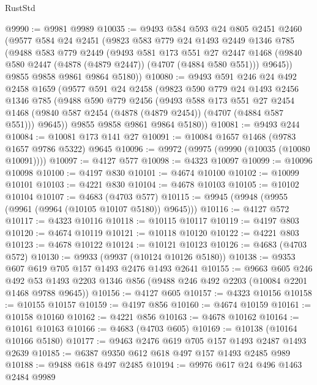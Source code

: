 \begin{lexlean}{RustStd}
\begin{coremodule}
@9990 := @9981 @9989
@10035 := @9493
    @584
    @593
    @24
    @805
    @2451
    @2460
    (@9577
      @584
      @24
      @2451
      (@9823
        @583
        @779
        @24
        @1493
        @2449
        @1346
        @785
        (@9488
          @583
          @779
          @2449
          (@9493
            @581
            @173
            @551
            @27
            @2447
            @1468
            (@9840 @580 @2447 (@4878 (@4879 @2447)) (@4707 (@4884 @580 @551)))
            @9645))
        @9855
        @9858
        @9861
        @9864
        @5180))
@10080 := @9493
    @591
    @246
    @24
    @492
    @2458
    @1659
    (@9577
      @591
      @24
      @2458
      (@9823
        @590
        @779
        @24
        @1493
        @2456
        @1346
        @785
        (@9488
          @590
          @779
          @2456
          (@9493
            @588
            @173
            @551
            @27
            @2454
            @1468
            (@9840 @587 @2454 (@4878 (@4879 @2454)) (@4707 (@4884 @587 @551)))
            @9645))
        @9855
        @9858
        @9861
        @9864
        @5180))
@10081 := @9493 @244
@10084 := @10081 @173 @141 @27
@10091 := @10084 @1657 @1468 (@9783 @1657 @9786 @5322) @9645
@10096 := @9972 (@9975 (@9990 (@10035 (@10080 @10091))))
@10097 := @4127 @577
@10098 := @4323 @10097
@10099 := @10096 @10098
@10100 := @4197 @830
@10101 := @4674 @10100
@10102 := @10099 @10101
@10103 := @4221 @830
@10104 := @4678 @10103
@10105 := @10102 @10104
@10107 := @4683 (@4703 @577)
@10115 := @9945 (@9948 (@9955 (@9961 (@9964 (@10105 @10107 @5180)) @9645)))
@10116 := @4127 @572
@10117 := @4323 @10116
@10118 := @10115 @10117
@10119 := @4197 @803
@10120 := @4674 @10119
@10121 := @10118 @10120
@10122 := @4221 @803
@10123 := @4678 @10122
@10124 := @10121 @10123
@10126 := @4683 (@4703 @572)
@10130 := @9933 (@9937 (@10124 @10126 @5180))
@10138 := @9353 @607 @619 @705 @157 @1493 @2476 @1493 @2641
@10155 := @9663
    @605
    @246
    @492
    @53
    @1493
    @2203
    @1346
    @856
    (@9488 @246 @492 @2203 (@10084 @2201 @1468 @9788 @9645))
@10156 := @4127 @605
@10157 := @4323 @10156
@10158 := @10155 @10157
@10159 := @4197 @856
@10160 := @4674 @10159
@10161 := @10158 @10160
@10162 := @4221 @856
@10163 := @4678 @10162
@10164 := @10161 @10163
@10166 := @4683 (@4703 @605)
@10169 := @10138 (@10164 @10166 @5180)
@10177 := @9463 @2476 @619 @705 @157 @1493 @2487 @1493 @2639
@10185 := @6387 @9350 @612 @618 @497 @157 @1493 @2485 @989
@10188 := @9488 @618 @497 @2485
@10194 := @9976 @617 @24 @496 @1463 @2484 @9989

\end{coremodule}
\end{lexlean}
